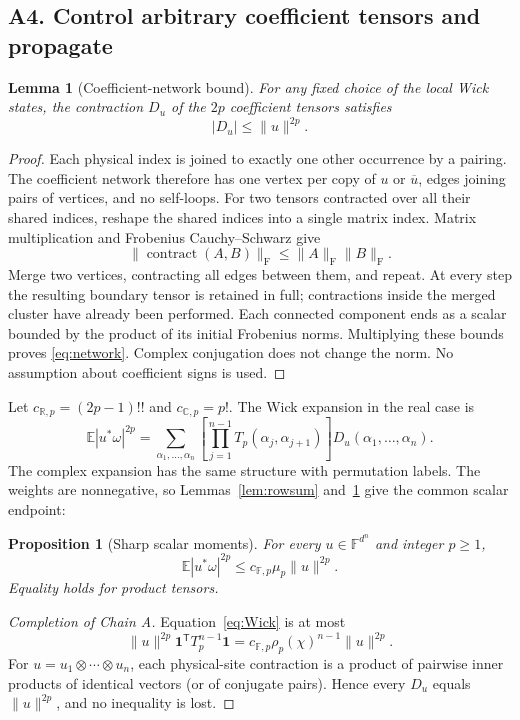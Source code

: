 \documentclass[11pt]{article}
\numberwithin{equation}{section}
\newtheorem{lemma}[theorem]{Lemma}
\newtheorem{proposition}[theorem]{Proposition}
\theoremstyle{definition}\newtheorem{definition}[theorem]{Definition}
\theoremstyle{remark}\newtheorem{remark}[theorem]{Remark}
\newcommand{\R}{\mathbb R}\newcommand{\E}{\mathbb E}\newcommand{\Prob}{\mathbb P}
\newcommand{\norm}[1]{\lVert#1\rVert}\newcommand{\ip}[2]{\langle#1,#2\rangle}
\newcommand{\one}{\mathbf1}\newcommand{\F}{\mathbb F}
\newcommand{\C}{\mathbb C}
\begin{document}
\subsection{A4. Control arbitrary coefficient tensors and propagate}
\begin{lemma}[Coefficient-network bound]\label{lem:network}
For any fixed choice of the local Wick states, the contraction $D_u$ of the
$2p$ coefficient tensors satisfies
\begin{equation}\label{eq:network}
 |D_u|\le\norm u^{2p}.
\end{equation}
\end{lemma}
\begin{proof}
Each physical index is joined to exactly one other occurrence by a pairing.
The coefficient network therefore has one vertex per copy of $u$ or
$\overline u$, edges joining pairs of vertices, and no self-loops.
For two tensors contracted over all their shared indices, reshape the shared
indices into a single matrix index. Matrix multiplication and Frobenius
Cauchy--Schwarz give
\[
 \norm{\operatorname{contract}(A,B)}_{\mathrm F}
 \le\norm A_{\mathrm F}\norm B_{\mathrm F}.
\]
Merge two vertices, contracting all edges between them, and repeat. At every
step the resulting boundary tensor is retained in full; contractions inside the
merged cluster have already been performed. Each connected component ends as
a scalar bounded by the product of its initial Frobenius norms. Multiplying
these bounds proves \eqref{eq:network}. Complex conjugation does not change the
norm. No assumption about coefficient signs is used.
\end{proof}

Let $c_{\R,p}=(2p-1)!!$ and $c_{\C,p}=p!$.
The Wick expansion in the real case is
\begin{equation}\label{eq:Wick}
 \E|u^*\omega|^{2p}
 =\sum_{\alpha_1,\ldots,\alpha_n}
 \left[\prod_{j=1}^{n-1}T_p(\alpha_j,\alpha_{j+1})\right]
 D_u(\alpha_1,\ldots,\alpha_n).
\end{equation}
The complex expansion has the same structure with permutation labels.
The weights are nonnegative, so Lemmas~\ref{lem:rowsum} and~\ref{lem:network}
give the common scalar endpoint:
\begin{proposition}[Sharp scalar moments]\label{prop:scalar}
For every $u\in\F^{d^n}$ and integer $p\ge1$,
\begin{equation}\label{eq:scalar}
 \boxed{\displaystyle\E|u^*\omega|^{2p}\le c_{\F,p}\mu_p\norm u^{2p}.}
\end{equation}
Equality holds for product tensors.
\end{proposition}
\begin{proof}[Completion of Chain A]
Equation~\eqref{eq:Wick} is at most
\[
 \norm u^{2p}\one^{\mathsf T}T_p^{n-1}\one
 =c_{\F,p}\rho_p(\chi)^{n-1}\norm u^{2p}.
\]
For $u=u_1\otimes\cdots\otimes u_n$, each physical-site contraction is a
product of pairwise inner products of identical vectors (or of conjugate
pairs). Hence every $D_u$ equals $\norm u^{2p}$, and no inequality is lost.
\end{proof}
\end{document}
